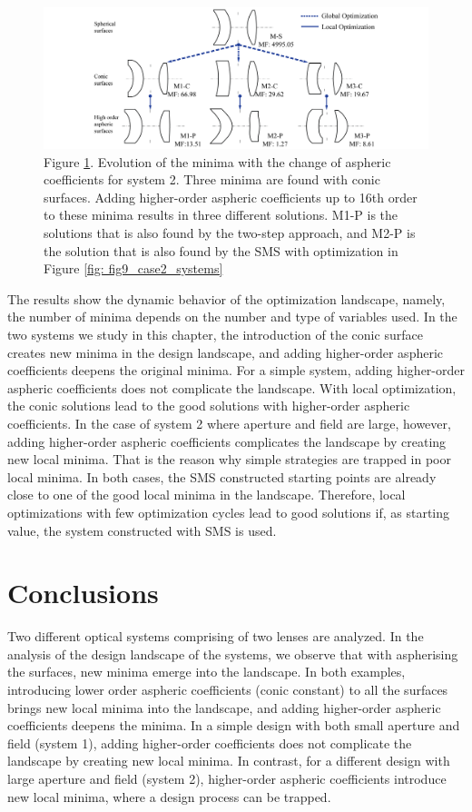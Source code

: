 \begin{figure}[h!]
    \centering
    \includegraphics[width=1\textwidth]{chapter-5/figures/Fig13_OE340147.png}
    \caption{Figure \ref{fig: fig13_case2_optStruc}. Evolution of the minima with the change of aspheric coefficients for system 2. Three minima are found with conic surfaces. Adding higher-order aspheric coefficients up to 16th order to these minima results in three different solutions. M1-P is the solutions that is also found by the two-step approach, and M2-P is the solution that is also found by the SMS with optimization in Figure \ref{fig: fig9_case2_systems}}
    \label{fig: fig13_case2_optStruc}
\end{figure}

The results show the dynamic behavior of the optimization landscape, namely, the number of minima depends on the number and type of variables used. In the two systems we study in this chapter, the introduction of the conic surface creates new minima in the design landscape, and adding higher-order aspheric coefficients deepens the original minima. For a simple system, adding higher-order aspheric coefficients does not complicate the landscape. With local optimization, the conic solutions lead to the good solutions with higher-order aspheric coefficients. In the case of system 2 where aperture and field are large, however, adding higher-order aspheric coefficients complicates the landscape by creating new local minima. That is the reason why simple strategies are trapped in poor local minima. In both cases, the SMS constructed starting points are already close to one of the good local minima in the landscape. Therefore, local optimizations with few optimization cycles lead to good solutions if, as starting value, the system constructed with SMS is used.

\section{Conclusions}

Two different optical systems comprising of two lenses are analyzed. In the analysis of the design landscape of the systems, we observe that with aspherising the surfaces, new minima emerge into the landscape. In both examples, introducing lower order aspheric coefficients (conic constant) to all the surfaces brings new local minima into the landscape, and adding higher-order aspheric coefficients deepens the minima. In a simple design with both small aperture and field (system 1), adding higher-order coefficients does not complicate the landscape by creating new local minima. In contrast, for a different design with large aperture and field (system 2), higher-order aspheric coefficients introduce new local minima, where a design process can be trapped.

